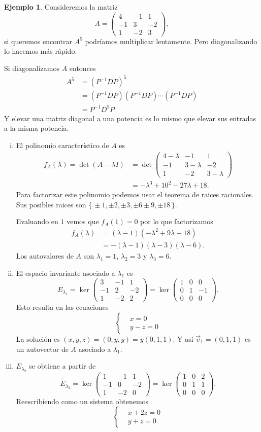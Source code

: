 \documentclass[12pt]{article}
\theoremstyle{plain}
\theoremstyle{definition}
\newtheorem{Ex}[Th]{Ejemplo}           %
\theoremstyle{remark}
\newcommand{\la}{\lambda}           %
\renewcommand{\:}{\colon}           %
\renewcommand{\.}{\Cdot}                %
\newcommand{\threebythree}[9]{\begin{pmatrix} %
  #1 & #2 & #3 \\ #4 & #5 & #6 \\ #7 & #8 & #9 \end{pmatrix}}
\newcommand{\set}[1]{\{\,#1\,\}}    %
\begin{document}
\begin{multicols}{2}
\begin{Ex}
Consideremos la matriz
$$A=\threebythree{4}{-1}{1}{-1}{3}{-2}{1}{-2}{3},$$
si queremos encontrar $A^5$ podríamos multiplicar lentamente. Pero diagonalizando lo hacemos más rápido.\par 
Si diagonalizamos $A$ entonces 
\begin{align*}
  A^5&=(P^{-1}DP)^5\\
  &=(P^{-1}DP)(P^{-1}DP)\cdots (P^{-1}DP)\\
  &=P^{-1}D^5P
\end{align*}
Y elevar una matriz diagonal a una potencia es lo mismo que elevar sus entradas a la misma potencia.
\begin{enumerate}[i)]
  \itemsep=-0.4em
  \item El polinomio característico de $A$ es 
  \begin{align*}
    f_A(\la)=\det(A-\la I)&=\det\threebythree{4-\la}{-1}{1}{-1}{3-\la}{-2}{1}{-2}{3-\la}\\
    &=-\la^3+10^2-27\la+18.
  \end{align*}
  Para factorizar este polinomio podemos usar el teorema de raices racionales. Sus posibles raices son $\set{\pm 1,\pm 2,\pm 3,\pm 6\pm 9,\pm 18}$.\par 
  Evaluando en $1$ vemos que $f_A(1)=0$ por lo que factorizamos 
  \begin{align*}
    f_A(\la)&=(\la-1)(-\la^2+9\la-18)\\
    &=-(\la-1)(\la-3)(\la-6).
  \end{align*}
  Los autovalores de $A$ son $\la_1=1$, $\la_2=3$ y $\la_3=6$.
  \item El espacio invariante asociado a $\la_1$ es 
  $$E_{\la_1}=\ker\threebythree{3}{-1}{1}{-1}{2}{-2}{1}{-2}{2}=\ker\threebythree{1}{0}{0}{0}{1}{-1}{0}{0}{0}.$$
  Esto resulta en las ecuaciones
  $$\left\lbrace
  \begin{aligned}
    &x=0\\
    &y-z=0
  \end{aligned}
  \right.
  $$
  La solución es $(x,y,z)=(0,y,y)=y(0,1,1)$. Y así $\vec{v}_1=(0,1,1)$ es un autovector de $A$ asociado a $\la_1$.
  \item $E_{\la_2}$ se obtiene a partir de
  $$E_{\la_2}=\ker\threebythree{1}{-1}{1}{-1}{0}{-2}{1}{-2}{0}=\ker\threebythree{1}{0}{2}{0}{1}{1}{0}{0}{0}.$$
  Reescribiendo como un sistema obtenemos 
  $$\left\lbrace
  \begin{aligned}
    &x+2z=0\\
    &y+z=0
  \end{aligned}
$$
\end{enumerate}
\end{Ex}
\end{multicols}
\end{document}
